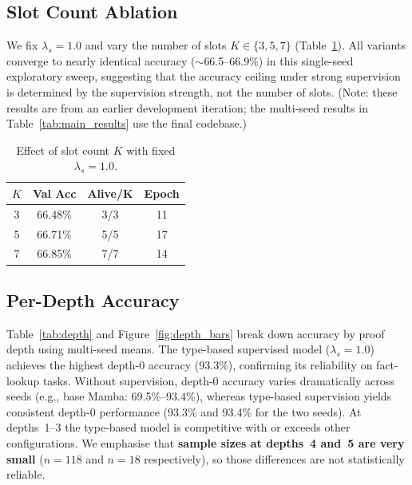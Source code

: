 \documentclass[conference]{IEEEtran}
\begin{document}
\subsection{Slot Count Ablation}
\label{sec:slot_count}

We fix $\lambda_s=1.0$ and vary the number of slots
$K \in \{3, 5, 7\}$ (Table~\ref{tab:slot_count}).  All
variants converge to nearly identical accuracy ($\sim$66.5--66.9\%)
in this single-seed exploratory sweep, suggesting that the
accuracy ceiling under strong supervision is determined by
the supervision strength, not the number of slots.
(Note: these results are from an earlier development iteration;
the multi-seed results in Table~\ref{tab:main_results} use the
final codebase.)

\begin{table}[t]
\centering
\small
\caption{Effect of slot count $K$ with fixed $\lambda_s=1.0$.}
\label{tab:slot_count}
\begin{tabular}{@{}cccc@{}}
\toprule
$K$ & \textbf{Val Acc} & \textbf{Alive/K} & \textbf{Epoch} \\
\midrule
3 & 66.48\% & 3/3 & 11 \\
5 & 66.71\% & 5/5 & 17 \\
7 & 66.85\% & 7/7 & 14 \\
\bottomrule
\end{tabular}
\end{table}

\subsection{Per-Depth Accuracy}
\label{sec:depth}

Table~\ref{tab:depth} and Figure~\ref{fig:depth_bars} break
down accuracy by proof depth using multi-seed means.
The type-based supervised model ($\lambda_s{=}1.0$) achieves
the highest depth-0 accuracy (93.3\%), confirming its
reliability on fact-lookup tasks.  Without supervision,
depth-0 accuracy varies dramatically across seeds (e.g.,
base Mamba: 69.5\%--93.4\%), whereas type-based supervision
yields consistent depth-0 performance (93.3\% and 93.4\% for
the two seeds).  At depths~1--3 the type-based model is
competitive with or exceeds other configurations.  We
emphasise that \textbf{sample sizes at depths~4 and~5 are
very small} ($n{=}118$ and $n{=}18$ respectively), so
those differences are not statistically reliable.
\end{document}
